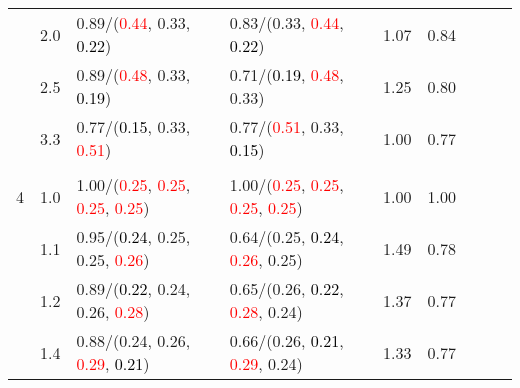\documentclass[10pt,a4paper]{report}
\begin{document}
\begin{table}[!htbp]
\begin{center}
{\begin{tabular}{ccllccccc}
				  & 2.0                               & 0.89/(\textcolor{red}{0.44}, 0.33, \textcolor{black}{0.22})                                       & 0.83/(0.33, \textcolor{red}{0.44}, \textcolor{black}{0.22})                                       & 1.07             & 0.84                     \\
				  & 2.5                               & 0.89/(\textcolor{red}{0.48}, 0.33, \textcolor{black}{0.19})                                       & 0.71/(\textcolor{black}{0.19}, \textcolor{red}{0.48}, 0.33)                                       & 1.25             & 0.80                     \\
				  & 3.3                               & 0.77/(\textcolor{black}{0.15}, 0.33, \textcolor{red}{0.51})                                       & 0.77/(\textcolor{red}{0.51}, 0.33, \textcolor{black}{0.15})                                       & 1.00             & 0.77                     \\
				  &                                   &                                                                                                   &                                                                                                   &                                             \\
				4 & 1.0                               & 1.00/(\textcolor{red}{0.25}, \textcolor{red}{0.25}, \textcolor{red}{0.25}, \textcolor{red}{0.25}) & 1.00/(\textcolor{red}{0.25}, \textcolor{red}{0.25}, \textcolor{red}{0.25}, \textcolor{red}{0.25}) & 1.00             & 1.00                     \\
				  & 1.1                               & 0.95/(\textcolor{black}{0.24}, 0.25, 0.25, \textcolor{red}{0.26})                                 & 0.64/(0.25, \textcolor{black}{0.24}, \textcolor{red}{0.26}, 0.25)                                 & 1.49             & 0.78                     \\
				  & 1.2                               & 0.89/(\textcolor{black}{0.22}, 0.24, 0.26, \textcolor{red}{0.28})                                 & 0.65/(0.26, \textcolor{black}{0.22}, \textcolor{red}{0.28}, 0.24)                                 & 1.37             & 0.77                     \\
				  & 1.4                               & 0.88/(0.24, 0.26, \textcolor{red}{0.29}, \textcolor{black}{0.21})                                 & 0.66/(0.26, \textcolor{black}{0.21}, \textcolor{red}{0.29}, 0.24)                                 & 1.33             & 0.77                     \\

\end{tabular}}
\end{center}
\end{table}
\end{document}
